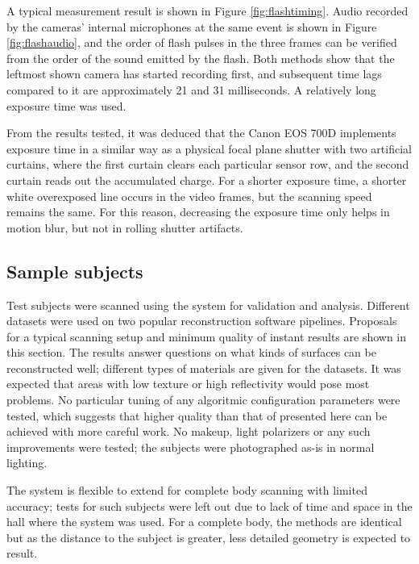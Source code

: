 A typical measurement result is shown in Figure \ref{fig:flashtiming}.
Audio recorded by the cameras' internal microphones at the same event is shown in Figure \ref{fig:flashaudio}, and the order of flash pulses in the three frames can be verified from the order of the sound emitted by the flash.
Both methods show that the leftmost shown camera has started recording first, and subsequent time lags compared to it are approximately 21 and 31 milliseconds.
A relatively long exposure time was used.

From the results tested, it was deduced that the Canon EOS 700D implements exposure time in a similar way as a physical focal plane shutter with two artificial curtains, where the first curtain clears each particular sensor row, and the second curtain reads out the accumulated charge.
For a shorter exposure time, a shorter white overexposed line occurs in the video frames, but the scanning speed remains the same.
For this reason, decreasing the exposure time only helps in motion blur, but not in rolling shutter artifacts.

\subsection{Sample subjects} \label{sec:samplesubjects}


Test subjects were scanned using the system for validation and analysis.
Different datasets were used on two popular reconstruction software pipelines.
Proposals for a typical scanning setup and minimum quality of instant results are shown in this section.
The results answer questions on what kinds of surfaces can be reconstructed well; different types of materials are given for the datasets.
It was expected that areas with low texture or high reflectivity would pose most problems.
No particular tuning of any algoritmic configuration parameters were tested, which suggests that higher quality than that of presented here can be achieved with more careful work.
No makeup, light polarizers or any such improvements were tested; the subjects were photographed as-is in normal lighting.

The system is flexible to extend for complete body scanning with limited accuracy; tests for such subjects were left out due to lack of time and space in the hall where the system was used.
For a complete body, the methods are identical but as the distance to the subject is greater, less detailed geometry is expected to result.

